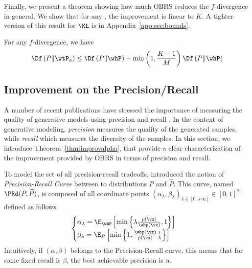 \documentclass[twoside]{article}
\begin{document}
Finally, we present a theorem showing how much OBRS reduces the $f$-divergence in general. We show that for any \fdiv, the improvement is linear to $K$. A tighter version of this result for $\KL$ is in Appendix~\ref{app:sec:bounds}.
\begin{theorem}\label{thm:bound}
For any $f$-divergence,
we have 
\[
\Df\left(P\Vert\wtP_a\right)\le\Df\left(P\Vert\whP\right)-\min\left(1,\frac{K-1}{M}\right)\Df\left(P\Vert\whP\right)
\]
\end{theorem}

\subsection{Improvement on the Precision/Recall}\label{subsec:OBRSPR}

A number of recent publications 
have stressed the importance of measuring the quality of generative models using precision and recall  \citep{ kynkaanniemi_improved_2019,djolonga_precision-recall_2020, naeem_reliable_2020, cheema_precision_2023, kim_toppr_2023}. In the context of generative modeling, \emph{precision} measures the quality of the generated samples,  while \emph{recall} which measures the diversity of the samples. In this section, we introduce Theorem~\ref{thm:improvalpha}, that provide a clear characterization of the improvement provided by OBRS in terms of precision and recall. 








To model the set of all precision-recall tradeoffs, \cite{simon_revisiting_2019} introduced the notion of \emph{Precision-Recall Curve} between to distributions $P$ and $\widehat{P}$. This curve, named $\PRd(P,\widehat{P})$,  is composed of all coordinate points $\left(\alpha_\lambda, \beta_\lambda\right)_{\lambda\in[0,+\infty]} \in [0, 1]^2$ defined as follows.
\begin{align}
\begin{cases}
        \alpha_\lambda = \E_{\whP}\left[\min\left\{\lambda \frac{p(\vx)}{\whp(\vx)}, 1\right\}\right] \\[3pt]
        \beta_\lambda =\E_{P}\left[\min\left\{1,\frac{\whp(\vx)}{p(\vx)}\frac{1}{\lambda}\right\}\right]
\end{cases}
\end{align}
Intuitively, if  $(\alpha,\beta)$ belongs to the Precision-Recall curve, this means that for some fixed recall is $\beta$, the best achievable precision is $\alpha$.
\end{document}
